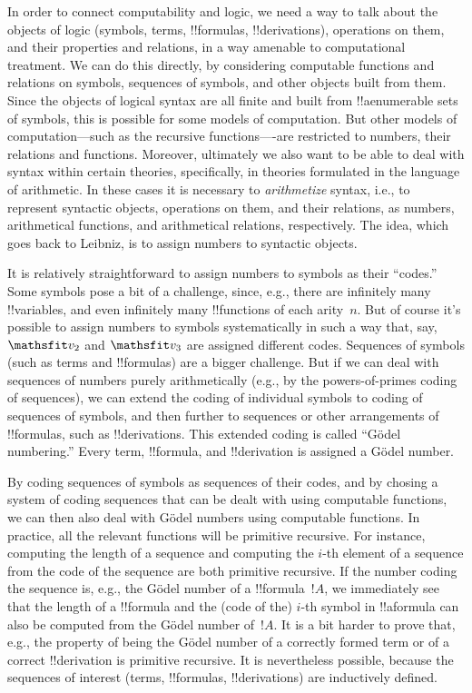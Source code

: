 \documentclass[../../../include/open-logic-section]{subfiles}
\begin{document}

In order to connect computability and logic, we need a way to talk
about the objects of logic (symbols, terms, !!{formula}s,
!!{derivation}s), operations on them, and their properties and
relations, in a way amenable to computational treatment.  We can do
this directly, by considering computable functions and relations on
symbols, sequences of symbols, and other objects built from them.
Since the objects of logical syntax are all finite and built from
!!a{enumerable} sets of symbols, this is possible for some models of
computation.  But other models of computation---such as the recursive
functions----are restricted to numbers, their relations and functions.
Moreover, ultimately we also want to be able to deal with syntax
within certain theories, specifically, in theories formulated in the
language of arithmetic.  In these cases it is necessary to
\emph{arithmetize} syntax, i.e., to represent syntactic objects,
operations on them, and their relations, as numbers, arithmetical
functions, and arithmetical relations, respectively. The idea, which
goes back to Leibniz, is to assign numbers to syntactic objects.

It is relatively straightforward to assign numbers to symbols as their
``codes.''  Some symbols pose a bit of a challenge, since, e.g., there
are infinitely many !!{variable}s, and even infinitely many
!!{function}s of each arity~$n$. But of course it's possible to assign
numbers to symbols systematically in such a way that, say, $\Obj v_2$
and $\Obj v_3$ are assigned different codes. Sequences of symbols
(such as terms and !!{formula}s) are a bigger challenge. But if we can
deal with sequences of numbers purely arithmetically (e.g., by the
powers-of-primes coding of sequences), we can extend the coding of
individual symbols to coding of sequences of symbols, and then further
to sequences or other arrangements of !!{formula}s, such as
!!{derivation}s. This extended coding is called ``G\"odel numbering.''
Every term, !!{formula}, and !!{derivation} is assigned a G\"odel
number.

By coding sequences of symbols as sequences of their codes, and by
chosing a system of coding sequences that can be dealt with using
computable functions, we can then also deal with G\"odel numbers using
computable functions.  In practice, all the relevant functions will be
primitive recursive.  For instance, computing the length of a sequence
and computing the $i$-th element of a sequence from the code of the
sequence are both primitive recursive. If the number coding the
sequence is, e.g., the G\"odel number of a !!{formula}~$!A$, we
immediately see that the length of a !!{formula} and the (code of the)
$i$-th symbol in !!a{formula} can also be computed from the G\"odel
number of~$!A$. It is a bit harder to prove that, e.g., the property
of being the G\"odel number of a correctly formed term or of a correct
!!{derivation} is primitive recursive.  It is nevertheless possible,
because the sequences of interest (terms, !!{formula}s,
!!{derivation}s) are inductively defined.
\end{document}
